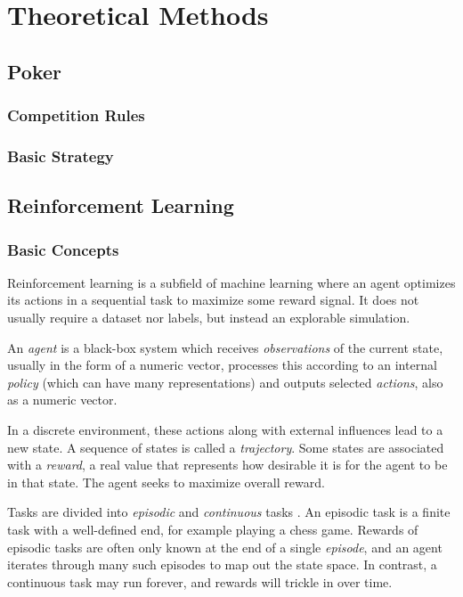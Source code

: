 \chapter{Theoretical Methods}


\section{Poker}

\subsection{Competition Rules}

\subsection{Basic Strategy}

\section{Reinforcement Learning}
\subsection{Basic Concepts}
Reinforcement learning is a subfield of machine learning where an agent optimizes its actions in a sequential task to maximize some reward signal. It does not usually require a dataset nor labels, but instead an explorable simulation.

An \textit{agent} is a black-box system which receives \textit{observations} of the current state, usually in the form of a numeric vector, processes this according to an internal \textit{policy} (which can have many representations) and outputs selected \textit{actions}, also as a numeric vector.

In a discrete environment, these actions along with external influences lead to a new state. A sequence of states is called a \textit{trajectory}. Some states are associated with a \textit{reward}, a real value that represents how desirable it is for the agent to be in that state. The agent seeks to maximize overall reward.

Tasks are divided into \textit{episodic} and \textit{continuous} tasks \cite[Chapters 3.3 \& 3.4]{Sutton}. An episodic task is a finite task with a well-defined end, for example playing a chess game. Rewards of episodic tasks are often only known at the end of a single \textit{episode}, and an agent iterates through many such episodes to map out the state space. In contrast, a continuous task may run forever, and rewards will trickle in over time. 

